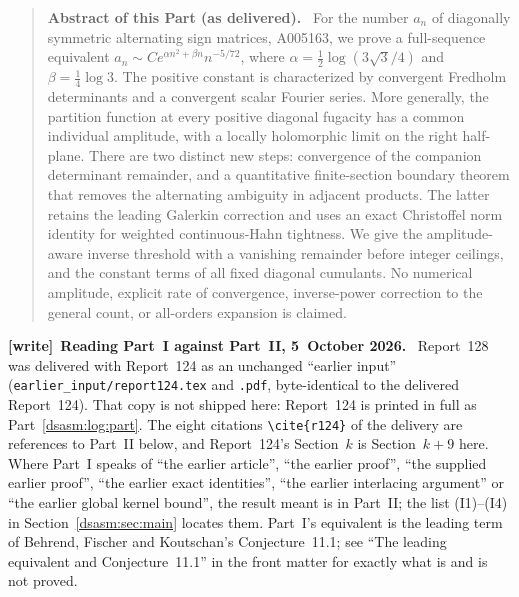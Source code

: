 \documentclass[11pt,letterpaper]{article}
\theoremstyle{remark}\newtheorem{remark}[theorem]{Remark}
\newcommand{\file}[1]{\nolinkurl{#1}}
\newenvironment{writenote}[1][]{\par\smallskip\begingroup\small
 \noindent\textbf{[write]}\if\relax\detokenize{#1}\relax\else~\textbf{#1.}\fi\ }%
 {\par\endgroup\smallskip}
\newenvironment{partabstract}{\begin{quote}\small\noindent\textbf{Abstract of this Part (as delivered).}\ }{\end{quote}}
\begin{document}
\begin{partabstract}
For the number $a_n$ of diagonally symmetric alternating sign matrices,
A005163, we prove a full-sequence equivalent
$a_n\sim C e^{\alpha n^2+\beta n}n^{-5/72}$, where
$\alpha=\tfrac12\log(3\sqrt3/4)$ and $\beta=\tfrac14\log3$.
The positive constant is characterized by convergent Fredholm determinants
and a convergent scalar Fourier series. More generally, the partition
function at every positive diagonal fugacity has a common individual
amplitude, with a locally holomorphic limit on the right half-plane.
There are two distinct new steps: convergence of the companion determinant
remainder, and a quantitative finite-section boundary theorem that removes
the alternating ambiguity in adjacent products. The latter retains the
leading Galerkin correction and uses an exact Christoffel norm identity
for weighted continuous-Hahn tightness. We give the amplitude-aware inverse
threshold with a vanishing remainder before integer ceilings, and the
constant terms of all fixed diagonal cumulants. No numerical amplitude,
explicit rate of convergence, inverse-power correction to the general
count, or all-orders expansion is claimed.
\end{partabstract}
\begin{writenote}[Reading Part~I against Part~II, 5~October 2026]
Report~128 was delivered with Report~124 as an unchanged ``earlier input'' (\file{earlier_input/report124.tex} and \file{.pdf}, byte-identical to the delivered Report~124). That copy is not shipped here: Report~124 is printed in full as Part~\ref{dsasm:log:part}. The eight citations \verb|\cite{r124}| of the delivery are references to Part~II below, and Report~124's Section~$k$ is Section~$k+9$ here. Where Part~I speaks of ``the earlier article'', ``the earlier proof'', ``the supplied earlier proof'', ``the earlier exact identities'', ``the earlier interlacing argument'' or ``the earlier global kernel bound'', the result meant is in Part~II; the list (I1)--(I4) in Section~\ref{dsasm:sec:main} locates them. Part~I's equivalent is the leading term of Behrend, Fischer and Koutschan's Conjecture~11.1; see ``The leading equivalent and Conjecture~11.1'' in the front matter for exactly what is and is not proved.
\end{writenote}
\end{document}

